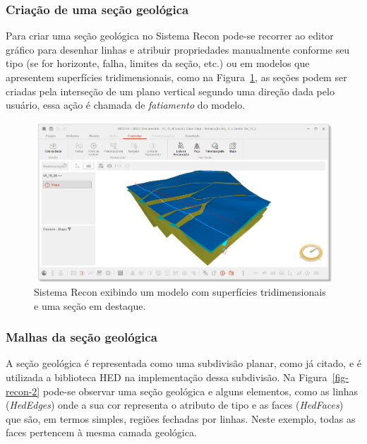\subsubsection{Criação de uma seção geológica}

Para criar uma seção geológica no Sistema Recon pode-se recorrer ao editor gráfico para desenhar linhas e atribuir propriedades manualmente conforme seu tipo (se for horizonte, falha, limites da seção, etc.) ou em modelos que apresentem superfícies tridimensionais, como na Figura~\ref{fig-recon-1}, as seções podem ser criadas pela interseção de um plano vertical segundo uma direção dada pelo usuário, essa ação é chamada de \textit{fatiamento} do modelo.

\begin{figure} [H]
  \begin{center}
    \includegraphics[width=\textwidth]{images/fig-recon-1}
    \caption{Sistema Recon exibindo um modelo com superfícies tridimensionais e uma seção em destaque.}\label{fig-recon-1}
  \end{center}
\end{figure}

\subsubsection{Malhas da seção geológica}

A seção geológica é representada como uma subdivisão planar, como já citado, e é utilizada a biblioteca HED na implementação dessa subdivisão. Na Figura~\ref{fig-recon-2} pode-se observar uma seção geológica e alguns elementos, como as linhas (\textit{HedEdges}) onde a sua cor representa o atributo de tipo e as faces (\textit{HedFaces}) que são, em termos simples, regiões fechadas por linhas. Neste exemplo, todas as faces pertencem à mesma camada geológica.

